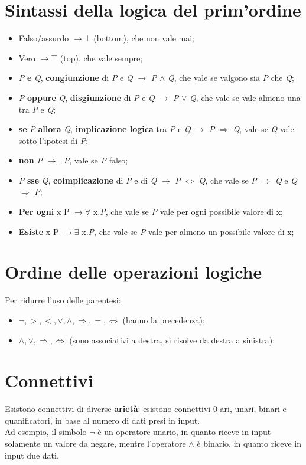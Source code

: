 \documentclass[12pt]{article}
\begin{document}
\section{Sintassi della logica del prim'ordine}
\begin{itemize}
    \item Falso/assurdo $\rightarrow \bot$ (bottom), che non vale mai;
    \item Vero $\rightarrow \top$ (top), che vale sempre;
    \item \textit{P} \textbf{e} \textit{Q}, \textbf{congiunzione} di \textit{P} e \textit{Q} $\rightarrow$ \textit{P} $\land$ \textit{Q}, che vale se valgono sia \textit{P} che \textit{Q};
    \item \textit{P} \textbf{oppure} \textit{Q}, \textbf{disgiunzione} di \textit{P} e \textit{Q} $\rightarrow$ \textit{P} $\lor$ \textit{Q}, che vale se vale almeno una tra \textit{P} e \textit{Q};
    \item \textbf{se} \textit{P} \textbf{allora} \textit{Q}, \textbf{implicazione logica} tra \textit{P} e \textit{Q} $\rightarrow$ \textit{P} $\Rightarrow$ \textit{Q}, vale se \textit{Q} vale sotto l'ipotesi di \textit{P};
    \item \textbf{non} \textit{P} $\rightarrow \neg$\textit{P}, vale se \textit{P} falso;
    \item \textit{P} \textbf{sse} \textit{Q}, \textbf{coimplicazione} di \textit{P} e di \textit{Q} $\rightarrow$ \textit{P} $\Leftrightarrow$ \textit{Q}, che vale se \textit{P} $\Rightarrow$ \textit{Q} e \textit{Q} $\Rightarrow$ \textit{P};
    \item \textbf{Per ogni} x P $\rightarrow \forall$ x.\textit{P}, che vale se \textit{P} vale per ogni possibile valore di x;
    \item \textbf{Esiste} x P $\rightarrow \exists$ x.\textit{P}, che vale se \textit{P} vale per almeno un possibile valore di x;  
\end{itemize}
\section{Ordine delle operazioni logiche}
Per ridurre l'uso delle parentesi:
\begin{itemize}
    \item $\neg, >, <, \lor, \land, \Rightarrow, =, \Leftrightarrow$ (hanno la precedenza);
    \item $\land, \lor, \Rightarrow, \Leftrightarrow$ (sono associativi a destra, si risolve da destra a sinistra); 
\end{itemize}
\section{Connettivi}
Esistono connettivi di diverse \textbf{arietà}: esistono connettivi 0-ari, unari, binari e quanificatori, in base al numero di dati presi in input.\\
Ad esempio, il simbolo $\neg$ è un operatore unario, in quanto riceve in input solamente un valore da negare, mentre l'operatore $\land$ è binario, in quanto riceve in input due dati.
\end{document}
